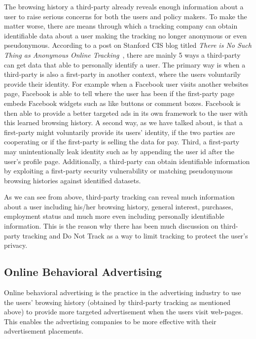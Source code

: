 \documentclass{sig-alternate}
\begin{document}
The browsing history a third-party already reveals enough information about a user to raise serious concerns for both the users and policy makers. To make the matter worse, there are means through which a tracking company can obtain identifiable data about a user making the tracking no longer anonymous or even pseudonymous. According to a post on Stanford CIS blog titled \emph{There is No Such Thing as Anonymous Online Tracking}~\cite{nosuchthing}, there are mainly 5 ways a third-party can get data that able to personally identify a user. The primary way is when a third-party is also a first-party in another context, where the users voluntarily provide their identity. For example when a Facebook user visits another websites page, Facebook is able to tell where the user has been if the first-party page embeds Facebook widgets such as like buttons or comment boxes. Facebook is then able to provide a better targeted ads in its own framework to the user with this learned browsing history. A second way, as we have talked about, is that a first-party might voluntarily provide its users’ identity, if the two parties are cooperating or if the first-party is selling the data for pay. Third, a first-party may unintentionally leak identity such as by appending the user id after the user’s profile page. Additionally, a third-party can obtain identifiable information by exploiting a first-party security vulnerability or matching pseudonymous browsing histories against identified datasets. 

As we can see from above, third-party tracking can reveal much information about a user including his/her browsing history, general interest, purchases, employment status and much more even including personally identifiable information. This is the reason why there has been much discussion on third-party tracking and Do Not Track as a way to limit tracking to protect the user’s privacy.

\subsection*{Online Behavioral Advertising} \label{sec:oba}

Online behavioral advertising is the practice in the advertising industry to use the users' browsing history (obtained by third-party tracking as mentioned above) to provide more targeted advertisement when the users visit web-pages. This enables the advertising companies to be more effective with their advertisement placements. 
\end{document}
